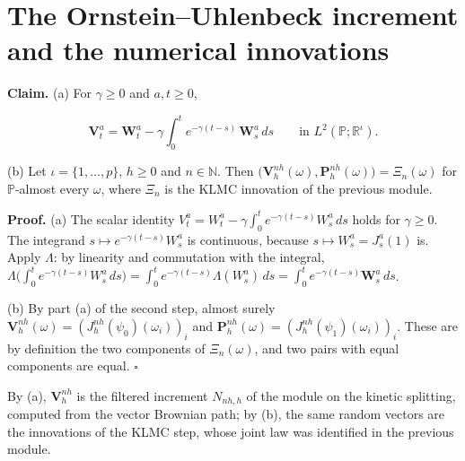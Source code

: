 \documentclass[11pt,a4paper]{article}
\begin{document}
\section{\texorpdfstring{The Ornstein–Uhlenbeck increment and the numerical innovations}{The Ornstein–Uhlenbeck increment and the numerical innovations}}


\textbf{Claim.} (a) For \(\gamma\ge0\) and \(a,t\ge0\),


\[\mathbf V^a_t=\mathbf W^a_t-\gamma\int_0^te^{-\gamma(t-s)}\,\mathbf W^a_s\,ds\qquad\text{in }L^2(\mathbb P;\mathbb R^\iota).\]


(b) Let \(\iota=\{1,\dots,p\}\), \(h\ge0\) and \(n\in\mathbb N\). Then \(\bigl(\mathbf V^{nh}_h(\omega),\mathbf P^{nh}_h(\omega)\bigr)=\Xi_n(\omega)\) for \(\mathbb P\)-almost every \(\omega\), where \(\Xi_n\) is the KLMC innovation of the previous module.




\textbf{Proof.} (a) The scalar identity \(V^a_t=W^a_t-\gamma\int_0^te^{-\gamma(t-s)}W^a_s\,ds\) holds for \(\gamma\ge0\). The integrand \(s\mapsto e^{-\gamma(t-s)}W^a_s\) is continuous, because \(s\mapsto W^a_s=J^a_s(1)\) is. Apply \(\Lambda\): by linearity and commutation with the integral, \(\Lambda\bigl(\int_0^te^{-\gamma(t-s)}W^a_s\,ds\bigr)=\int_0^te^{-\gamma(t-s)}\Lambda(W^a_s)\,ds=\int_0^te^{-\gamma(t-s)}\mathbf W^a_s\,ds\).




(b) By part (a) of the second step, almost surely \(\mathbf V^{nh}_h(\omega)=(J^{nh}_h(\psi_0)(\omega_i))_i\) and \(\mathbf P^{nh}_h(\omega)=(J^{nh}_h(\psi_1)(\omega_i))_i\). These are by definition the two components of \(\Xi_n(\omega)\), and two pairs with equal components are equal. \(\square\)




By (a), \(\mathbf V^{nh}_h\) is the filtered increment \(N_{nh,h}\) of the module on the kinetic splitting, computed from the vector Brownian path; by (b), the same random vectors are the innovations of the KLMC step, whose joint law was identified in the previous module.
\end{document}
